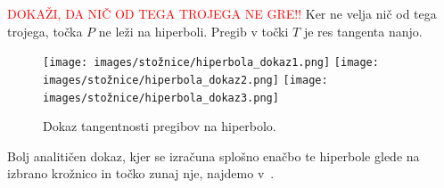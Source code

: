 \begin{dokaz}
    \textcolor{red}{DOKAŽI, DA NIČ OD TEGA TROJEGA NE GRE!!}
    Ker ne velja nič od tega trojega, točka $P$ ne leži na hiperboli. Pregib v točki $T$ je res tangenta nanjo.

    \begin{figure}[h]
        \centering
        \texttt{[image: images/stožnice/hiperbola\_dokaz1.png]}
        \texttt{[image: images/stožnice/hiperbola\_dokaz2.png]}
        \texttt{[image: images/stožnice/hiperbola\_dokaz3.png]}
        \caption[Tangentnost na hiperbolo]{Dokaz tangentnosti pregibov na hiperbolo.}
        \label{fig:dokaz_hiperbola}
    \end{figure}  
\end{dokaz}

Bolj analitičen dokaz, kjer se izračuna splošno enačbo te hiperbole glede na izbrano krožnico in točko zunaj nje, najdemo v~\cite[str.\ 205--206]{smith2003}.